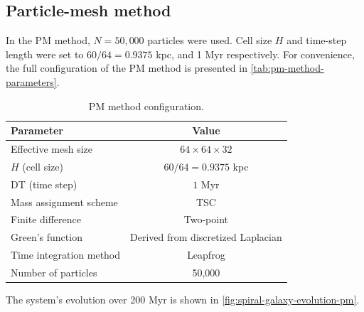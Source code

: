 \subsection{Particle-mesh method}
In the PM method, $N=50{,}000$ particles were used.
Cell size $H$ and time-step length were set to $60/64=0.9375$ kpc, and 1 Myr respectively.
For convenience, the full configuration of the PM method is presented in \autoref{tab:pm-method-parameters}.
\begin{table}[htp]
    \centering
    \begin{tabular}{|l|c|}
        \hline
        \textbf{Parameter}      & \textbf{Value}                     \\
        \hline
        Effective mesh size     & $64 \times 64 \times 32$           \\
        $H$ (cell size)         & $60/64=0.9375$ kpc                 \\
        DT (time step)          & $1$ Myr                            \\
        Mass assignment scheme  & TSC                                \\
        Finite difference       & Two-point                          \\
        Green's function        & Derived from discretized Laplacian \\
        Time integration method & Leapfrog                           \\
        Number of particles     & 50,000                             \\
        \hline
    \end{tabular}
    \caption{PM method configuration.}
    \label{tab:pm-method-parameters}
\end{table}
The system's evolution over 200 Myr is shown in \autoref{fig:spiral-galaxy-evolution-pm}.

